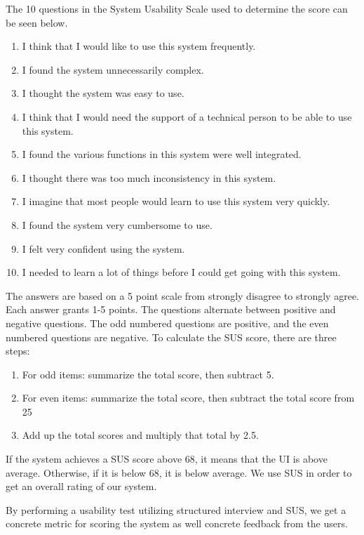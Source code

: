 The 10 questions in the System Usability Scale used to determine the score can be seen below.
\begin{enumerate}
	\item I think that I would like to use this system frequently.
	\item I found the system unnecessarily complex.
	\item I thought the system was easy to use.
	\item I think that I would need the support of a technical person to be able to use this system.
	\item I found the various functions in this system were well integrated.
	\item I thought there was too much inconsistency in this system.
	\item I imagine that most people would learn to use this system very quickly.
	\item I found the system very cumbersome to use.
	\item I felt very confident using the system.
	\item I needed to learn a lot of things before I could get going with this system.
\end{enumerate}
The answers are based on a 5 point scale from strongly disagree to strongly agree.
Each answer grants 1-5 points.
The questions alternate between positive and negative questions. The odd numbered questions are positive, and the even numbered questions are negative.\cite{adobeSUS}
To calculate the SUS score, there are three steps:
\begin{enumerate}
	\item For odd items: summarize the total score, then subtract 5.
	\item For even items: summarize the total score, then subtract the total score from 25
	\item Add up the total scores and multiply that total by 2.5.
\end{enumerate}
If the system achieves a SUS score above 68, it means that the UI is above average. Otherwise, if it is below 68, it is below average\cite{adobeSUS}.
We use SUS in order to get an overall rating of our system.

By performing a usability test utilizing structured interview and SUS, we get a concrete metric for scoring the system as well concrete feedback from the users.